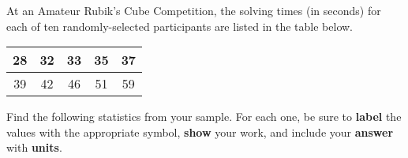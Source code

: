 \documentclass[noanswers]{exam}
\begin{document}
\begin{questions}
\begin{parts}
\begin{solution}[\stretch{1}]
		\end{solution}	
		
	\end{parts}
	
	\newpage	
	
	\question At an Amateur Rubik's Cube Competition, the solving times (in seconds) for each of ten randomly-selected participants are listed in the table below. 
	
	\begin{center}
    \begin{tabular}{| c | c | c | c | c |}
        \hline
        28 & 32 & 33 & 35 & 37 \\
        \hline
        39 & 42 & 46 & 51 & 59 \\
        \hline 
    \end{tabular}
\end{center}

Find the following statistics from your sample. For each one, be sure to \textbf{label} the values with the appropriate symbol, \textbf{show} your work, and include your \textbf{answer} with \textbf{units}.

\vspace{3mm}

\end{questions}
\end{document}
